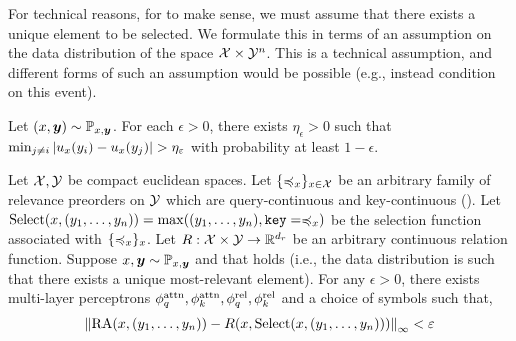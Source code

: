 For technical reasons, for  to make sense, we must assume that there exists a unique element to be selected. We formulate this in terms of an assumption on the data distribution of the space ${\mathcal{X}} \times {\mathcal{Y}}^n$. This is a technical assumption, and different forms of such an assumption would be possible (e.g., instead condition on this event).
\begin{assumption}\label{ass:select_unique}
  Let $(x, \bm{y}) \sim {\mathbb{P}}_{x,\bm{y}}$. For each $\epsilon > 0$, there exists $\eta_\epsilon > 0$ such that $\min_{j \neq i} \left\lvert u_x(y_i) - u_x(y_j)\right\rvert > \eta_\varepsilon$ with probability at least $1 - \epsilon$.
\end{assumption}


\begin{theorem}\label{theorem:func_class}
  Let ${\mathcal{X}}, {\mathcal{Y}}$ be compact euclidean spaces. Let $\{\preccurlyeq_x\}_{x \in {\mathcal{X}}}$ be an arbitrary family of relevance preorders on ${\mathcal{Y}}$ which are query-continuous and key-continuous (). Let $\mathrm{Select}(x, (y_1, \ldots, y_n)) = \max((y_1, \ldots, y_n), \mathtt{key}=\preccurlyeq_x)$ be the selection function associated with $\{\preccurlyeq_x\}_{x}$. Let $R: {\mathcal{X}} \times {\mathcal{Y}} \to \mathbb{R}^{d_r}$ be an arbitrary continuous relation function. Suppose $x, \bm{y} \sim {\mathbb{P}}_{x, \bm{y}}$ and that  holds (i.e., the data distribution is such that there exists a unique most-relevant element). For any $\epsilon > 0$, there exists multi-layer perceptrons $\phi_q^{\mathrm{attn}}, \phi_k^{\mathrm{attn}}, \phi_q^{\mathrm{rel}}, \phi_k^{\mathrm{rel}}$ and a choice of symbols such that,
  \begin{equation*}
    \left\lVert\mathrm{RA}(x, (y_1, \ldots, y_n)) - R(x, \mathrm{Select}(x, (y_1, \ldots, y_n)))\right\rVert_{\infty} < \varepsilon
  \end{equation*}
\end{theorem}

